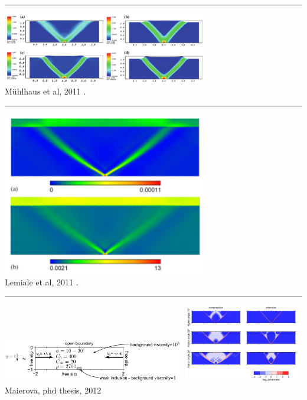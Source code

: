 \begin{center}\noindent\rule{8cm}{0.4pt}\end{center}

\begin{center}
\includegraphics[width=9cm]{images/benchmark_brick/muso11}\\
{\captionfont M{\"u}hlhaus et al, 2011 \cite{muso11}.}
\end{center}

\begin{center}\noindent\rule{8cm}{0.4pt}\end{center}

\begin{center}
\includegraphics[width=9cm]{images/benchmark_brick/lemm11}\\
{\captionfont Lemiale et al, 2011 \cite{lemm11}.}
\end{center}

\begin{center}\noindent\rule{8cm}{0.4pt}\end{center}

\begin{center}
\includegraphics[width=8cm]{images/benchmark_brick/maie12a}
\includegraphics[width=5cm]{images/benchmark_brick/maie12b}\\
{\captionfont Maierova, phd thesis, 2012 \cite{maie12}}
\end{center}

